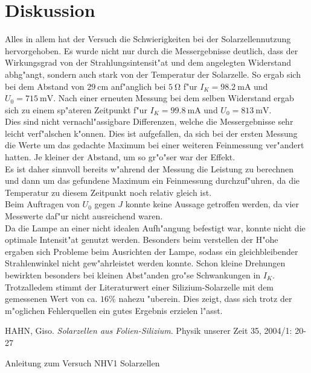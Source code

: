 \newpage
\section{Diskussion}
	\label{sec:diskussion}

	Alles in allem hat der Versuch die Schwierigkeiten bei der Solarzellennutzung hervorgehoben.
	Es wurde nicht nur durch die Messergebnisse deutlich, dass der Wirkungsgrad von der Strahlungsintensit"at und dem angelegten Widerstand abhg"angt, sondern auch stark von der Temperatur der Solarzelle.
	So ergab sich bei dem Abstand von $\SI{29}{\centi\meter}$ anf"anglich bei $\SI{5}{\ohm}$ f"ur $I_K = \SI{98.2}{\milli\ampere}$ und $U_0 = \SI{715}{\milli\volt}$.
	Nach einer erneuten Messung bei dem selben Widerstand ergab sich zu einem sp"ateren Zeitpunkt f"ur $I_K = \SI{99.8}{\milli\ampere}$ und $U_0 = \SI{813}{\milli\volt}$.\\ 
	Dies sind nicht vernachl"assigbare Differenzen, welche die Messergebnisse sehr leicht verf"alschen k"onnen.
	Dies ist aufgefallen, da sich bei der ersten Messung die Werte um das gedachte Maximum bei einer weiteren Feinmessung ver"andert hatten.
	Je kleiner der Abstand, um so gr"o"ser war der Effekt.\\
	Es ist daher sinnvoll bereits w"ahrend der Messung die Leistung zu berechnen und dann um das gefundene Maximum ein Feinmessung durchzuf"uhren, da die Temperatur zu diesem Zeitpunkt noch relativ gleich ist.\\
	Beim Auftragen von $U_0$ gegen $J$ konnte keine Aussage getroffen werden, da vier Messwerte daf"ur nicht ausreichend waren.\\
	Da die Lampe an einer nicht idealen Aufh"angung befestigt war, konnte nicht die optimale Intensit"at genutzt werden.
	Besonders beim verstellen der H"ohe ergaben sich Probleme beim Ausrichten der Lampe, sodass ein gleichbleibender Strahlenwinkel nicht gew"ahrleistet werden konnte.
	Schon kleine Drehungen bewirkten besonders bei kleinen Abst"anden gro"se Schwankungen in $I_K$.\\
	Trotzalledem stimmt der Literaturwert einer Silizium-Solarzelle  mit dem gemessenen Wert von ca. $16\%$ nahezu "uberein.
	Dies zeigt, dass sich trotz der m"oglichen Fehlerquellen ein gutes Ergebnis erzielen l"asst.

\begin{thebibliography}{9}
	 HAHN, Giso. \emph{Solarzellen aus Folien-Silizium}. Physik unserer Zeit 35, 2004/1: 20-27

	 Anleitung zum Versuch NHV1 Solarzellen
\end{thebibliography}